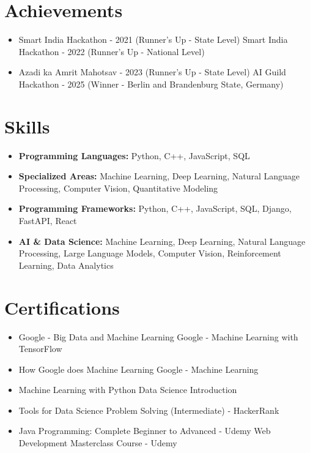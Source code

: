 \documentclass[a4paper,10pt]{article}
\begin{document}
\section*{Achievements}
\begin{itemize}
\item Smart India Hackathon - 2021 (Runner's Up - State Level) \hfill Smart India Hackathon - 2022 (Runner's Up - National Level)
\item Azadi ka Amrit Mahotsav - 2023 (Runner's Up - State Level) \hfill AI Guild Hackathon - 2025 (Winner - Berlin and Brandenburg State, Germany)
\end{itemize}

\section*{Skills}
\begin{itemize}
  \item \textbf{Programming Languages:} Python, C++, JavaScript, SQL
  \item \textbf{Specialized Areas:} Machine Learning, Deep Learning, Natural Language Processing, Computer Vision, Quantitative Modeling
  \item \textbf{Programming Frameworks:} Python, C++, JavaScript, SQL, Django, FastAPI, React
  \item \textbf{AI \& Data Science:} Machine Learning, Deep Learning, Natural Language Processing, Large Language Models, Computer Vision, Reinforcement Learning, Data Analytics
\end{itemize}

\section*{Certifications}
\begin{itemize}
\item Google - Big Data and Machine Learning \hfill Google - Machine Learning with TensorFlow
\item How Google does Machine Learning \hfill Google - Machine Learning
\item Machine Learning with Python \hfill Data Science Introduction
\item Tools for Data Science \hfill Problem Solving (Intermediate) - HackerRank
\item Java Programming: Complete Beginner to Advanced - Udemy \hfill Web Development Masterclass Course - Udemy
\end{itemize}
\end{document}
